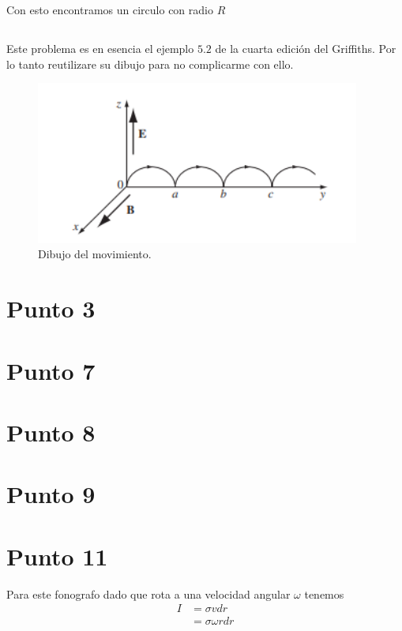 \documentclass{report}
\begin{document}
Con esto encontramos un circulo con radio $R$

\section{}

Este problema es en esencia el ejemplo $5.2$ de la cuarta edición del Griffiths. Por lo tanto reutilizare su dibujo para no complicarme con ello.

\begin{figure}
	\begin{center}
		\includegraphics[width=0.95\textwidth]{img/book_5_7.png}
	\end{center}
	\caption{Dibujo del movimiento.}\label{fig:book_5_7}
\end{figure}

\chapter{Punto 3}

\chapter{Punto 7}

\chapter{Punto 8}

\chapter{Punto 9}

\chapter{Punto 11}

Para este fonografo dado que rota a una velocidad angular $\omega$ tenemos
\begin{align*}
	I &= \sigma v dr\\
	&= \sigma \omega r dr
\end{align*}
\end{document}

